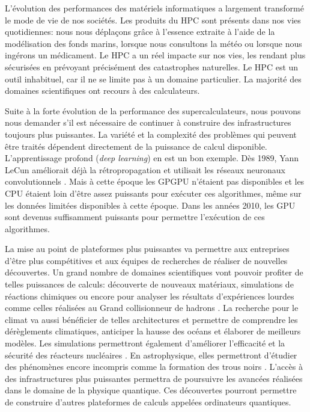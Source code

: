             
        L'évolution des performances des matériels informatiques a largement transformé le mode de vie de nos sociétés. Les produits du HPC sont présents dans nos vies quotidiennes: nous nous déplaçons grâce à l'essence extraite à l'aide de la modélisation des fonds marins, lorsque nous consultons la météo ou lorsque nous ingérons un médicament. Le HPC a un réel impacte sur nos vies, les rendant plus sécurisées en prévoyant précisément des catastrophes naturelles. 
        Le HPC est un outil inhabituel, car il ne se limite pas à un domaine particulier. La majorité des domaines scientifiques ont recours à des calculateurs. 
  
        Suite à la forte évolution de la performance des supercalculateurs, nous pouvons nous demander s'il est nécessaire de continuer à construire des infrastructures toujours plus puissantes. La variété et la complexité des problèmes qui peuvent être traités dépendent directement de la puissance de calcul disponible. L’apprentissage profond (\textit{deep learning}) en est un bon exemple. Dès 1989, Yann LeCun améliorait déjà la rétropropagation \cite{Treibig2012a} et utilisait les réseaux neuronaux convolutionnels \cite{LeCun1989}. Mais à cette époque les GPGPU n'étaient pas disponibles et les CPU étaient loin d'être assez puissants pour exécuter ces algorithmes, même sur les données limitées disponibles à cette époque. Dans les années 2010, les GPU sont devenus suffisamment puissants pour permettre l'exécution de ces algorithmes.
        
        
        La mise au point de plateformes plus puissantes va permettre aux entreprises d'être plus compétitives et aux équipes de recherches de réaliser de nouvelles découvertes. Un grand nombre de domaines scientifiques vont pouvoir profiter de telles puissances de calculs: découverte de nouveaux matériaux, simulations de réactions chimiques ou encore pour analyser les résultats d'expériences lourdes comme celles réalisées au Grand collisionneur de hadrons \cite{10.1007/978-3-319-67630-2_52}. La recherche pour le climat va aussi bénéficier de telles architectures et permettre de comprendre les dérèglements climatiques, anticiper la hausse des océans et élaborer de meilleurs modèles. Les simulations permettront également d'améliorer l'efficacité et la sécurité des réacteurs nucléaires \cite{Simon2007}. En astrophysique, elles permettront d'étudier des phénomènes encore incompris comme la formation des trous noirs \cite{10.1007/978-3-642-38750-0_2}. L'accès à des infrastructures plus puissantes permettra de poursuivre les avancées réalisées dans le domaine de la physique quantique. Ces découvertes pourront permettre de construire d'autres plateformes de calculs appelées ordinateurs quantiques.
        
